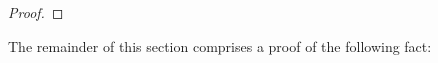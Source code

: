 \documentclass[11pt,letterpaper]{article}
\theoremstyle{plain}
\theoremstyle{definition}
\newcommand{\lenslib}{\texttt{lens}}
\newcommand{\rep}[2]{{\ensuremath \left\langle #1 \mid #2 \right\rangle}}
\newcommand{\hto}{\ensuremath{\,\mathaccent\shortmid\rightarrow\,}}
\newcommand{\todo}[1]{\textcolor{red}{\small #1}}
\begin{document}
\begin{proof}
%
\end{proof}


The remainder of this section comprises a proof of the following fact:
\end{document}
